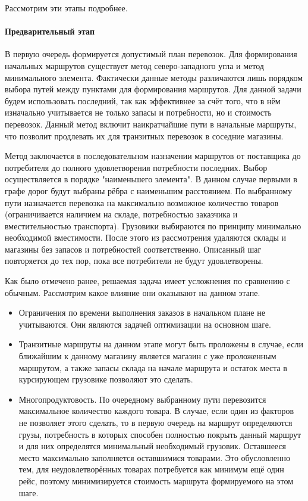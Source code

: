 	Рассмотрим эти этапы подробнее.
	
	\paragraph{Предварительный этап}
	В первую очередь формируется допустимый план перевозок. Для формирования начальных маршрутов существует метод северо-западного угла и метод минимального элемента. Фактически данные методы различаются лишь порядком выбора путей между пунктами для формирования маршрутов. Для данной задачи будем использовать последний, так как эффективнее\cite{potential:polyindex} за счёт того, что в нём изначально учитывается не только запасы и потребности, но и стоимость перевозок. Данный метод включит наикратчайшие пути в начальные маршруты, что позволит продлевать их  для транзитных перевозок в соседние магазины.
	
	Метод заключается в последовательном назначении маршрутов от поставщика до потребителя до полного удовлетворения потребности последних. Выбор осуществляется в порядке "наименьшего элемента". В данном случае первыми в графе дорог будут выбраны рёбра с наименьшим расстоянием. По выбранному пути назначается перевозка на максимально возможное количество товаров (ограничивается наличием на складе, потребностью заказчика и вместительностью транспорта). Грузовики выбираются по принципу минимально необходимой вместимости. После этого из рассмотрения удаляются склады и магазины без запасов и потребностей соответственно. Описанный шаг повторяется до тех пор, пока все потребители не будут удовлетворены.
	
	Как было отмечено ранее, решаемая задача имеет усложнения по сравнению с обычным. Рассмотрим какое влияние они оказывают на данном этапе.
	\begin{itemize}
		\item Ограничения по времени выполнения заказов в начальном плане не учитываются. Они являются задачей оптимизации на основном шаге.
		\item Транзитные маршруты на данном этапе могут быть проложены в случае, если ближайшим к данному магазину является магазин с уже проложенным маршрутом, а также запасы склада на начале маршрута и остаток места в курсирующем грузовике позволяют это сделать.
		\item Многопродуктовость\cite{trans:polyprod}. По очередному выбранному пути перевозится максимальное количество каждого товара. В случае, если один из факторов не позволяет этого сделать, то в первую очередь на маршрут определяются грузы, потребность в которых способен полностью покрыть данный маршрут и для них определятся минимальный необходимый грузовик. Оставшееся место максимально заполняется  оставшимися товарами. Это обусловленно тем, для неудовлетворённых товарах потребуется как минимум ещё один рейс, поэтому минимизируется стоимость маршрута формируемого на этом шаге.
	\end{itemize}
	
